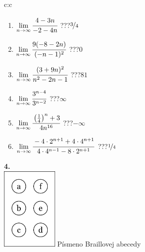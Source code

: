 \documentclass[10pt]{report}
\begin{document}
\begin{tabular}{c:c}
\begin{minipage}[c][104.5mm][t]{0.5\linewidth}
\begin{center}
\begin{minipage}{0.79\linewidth}
\begin{center}
\begin{varwidth}{\linewidth}
\begin{enumerate}
\normalsize
\item $\lim\limits_{n\to\infty}\cfrac{4-3n}{-2-4n}$\quad \dotfill\; ???\;\dotfill \quad $\nicefrac{3}{4}$
\item $\lim\limits_{n\to\infty}\cfrac{9(-8-2n)}{(-n-1)^2}$\quad \dotfill\; ???\;\dotfill \quad $0$
\item $\lim\limits_{n\to\infty}\cfrac{(3+9n)^2}{n^2-2n-1}$\quad \dotfill\; ???\;\dotfill \quad $81$
\item $\lim\limits_{n\to\infty}\cfrac{3^{n-4}}{3^{n-2}}$\quad \dotfill\; ???\;\dotfill \quad $\infty$
\item $\lim\limits_{n\to\infty}\cfrac{\left(\frac{1}{4}\right)^n +3}{4n^{16}}$\quad \dotfill\; ???\;\dotfill \quad $-\infty$
\item $\lim\limits_{n\to\infty}\cfrac{-4\cdot 2^{n+1}+4\cdot 4^{n+1}}{4\cdot 4^{n-1}-8\cdot 2^{n+1}}$\quad \dotfill\; ???\;\dotfill \quad $\nicefrac{1}{4}$
\end{enumerate}
\end{varwidth}
\end{center}
\end{minipage}
\begin{minipage}{0.20\linewidth}
\begin{center}
{\Huge\bfseries 4.} \\[2mm]
\includegraphics[height=40mm]{../images/braille.png}
{\small Písmeno Braillovej abecedy}
\end{center}
\end{minipage}
\end{center}
\end{minipage}
%
\end{tabular}
\newpage
\thispagestyle{empty}
\end{document}
